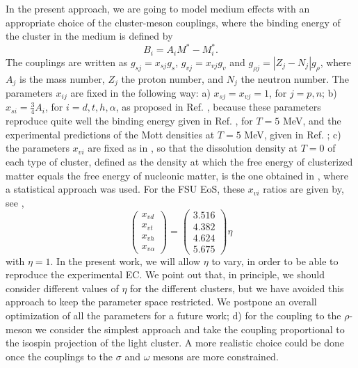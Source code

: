 \documentclass[aps,prc,nofootinbib,twocolumn,showpacs]{revtex4-1}
\begin{document}
In the present approach, we are going to model  medium effects with an appropriate choice of the cluster-meson
couplings, where the binding energy of the cluster in the
medium is defined by
\begin{equation}
B_i=A_i M^*-M^*_i.
\label{Bi}
\end{equation}
 The couplings are written as $g_{sj}=x_{sj} g_s$,   $g_{vj}= x_{vj} g_v$
and $g_{\rho j}=|Z_j-N_j| g_{\rho}$, 
where $A_j$ is the mass number, 
$Z_j$  the proton number, and 
$N_j$ the neutron number. 
The parameters $x_{ij}$ are fixed in the following way:
a) $x_{sj}=x_{vj}=1$, for $j=p,n$; b) 
 $x_{si}=\frac{3}{4}A_i$, for
 $i=d,t,h,\alpha$, as proposed in Ref. \cite{ferreira12}, because these
 parameters reproduce quite well the binding energy given in Ref.
 \cite{typel10}, for $T=5$ MeV, and the experimental predictions of the  Mott
 densities at $T=5$ MeV, given in Ref. \cite{hagel12};
c)  the parameters $x_{vi}$  are fixed as in \cite{ferreira12}, so that the
dissolution density at $T=0$ of each type of cluster, defined as the density at which the free energy of
clusterized matter equals the free energy of nucleonic matter,  is the one obtained in \cite{typel10}, where
a statistical approach was used. For the FSU \cite{fsu} EoS, these
  $x_{vi}$ ratios are given by, see  \cite{ferreira12},
\begin{equation}
\left(\begin{array}{c} x_{vd}\\x_{vt}\\x_{vh}\\x_{v\alpha}
\end{array}\right)= 
\left(\begin{array}{c} 3.516\\4.382\\4.624\\5.675
\end{array}\right)
\eta
\label{gveta}
\end{equation}
with $\eta=1$.  In the present work, we will allow $\eta$ to vary,
in order to be able to reproduce the experimental EC. We point out
that, in principle, we should consider different values of $\eta$ for
the different clusters, but we have avoided this approach to keep the
parameter space restricted. We postpone an overall optimization of
all the parameters for a  future work;
d) for the coupling to the $\rho$-meson we consider the simplest
approach and take the  coupling  proportional to the
isospin projection of the light cluster. A more realistic choice could
be done once the couplings to the $\sigma$ and $\omega$ mesons are
more constrained.
\end{document}

